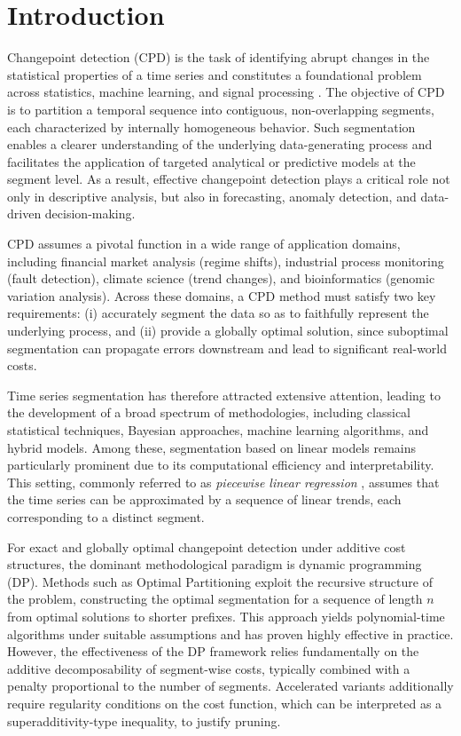 \documentclass[preprints,article,submit,pdftex,moreauthors]{Definitions/mdpi}
\begin{document}
\section{Introduction} 							\label{sec:intro}

Changepoint detection (CPD) is the task of identifying abrupt changes in the statistical properties of a time series and constitutes a foundational problem across statistics, machine learning, and signal processing \cite{LMS14,AC17,TOV20}. The objective of CPD is to partition a temporal sequence into contiguous, non-overlapping segments, each characterized by internally homogeneous behavior. Such segmentation enables a clearer understanding of the underlying data-generating process and facilitates the application of targeted analytical or predictive models at the segment level. As a result, effective changepoint detection plays a critical role not only in descriptive analysis, but also in forecasting, anomaly detection, and data-driven decision-making.

CPD assumes a pivotal function in a wide range of application domains, including financial market analysis (regime shifts), industrial process monitoring (fault detection), climate science (trend changes), and bioinformatics (genomic variation analysis). Across these domains, a CPD method must satisfy two key requirements: (i) accurately segment the data so as to faithfully represent the underlying process, and (ii) provide a globally optimal solution, since suboptimal segmentation can propagate errors downstream and lead to significant real-world costs.

Time series segmentation has therefore attracted extensive attention, leading to the development of a broad spectrum of methodologies, including classical statistical techniques, Bayesian approaches, machine learning algorithms, and hybrid models. Among these, segmentation based on linear models remains particularly prominent due to its computational efficiency and interpretability. This setting, commonly referred to as {\it piecewise linear regression} \cite{KCHP02}, assumes that the time series can be approximated by a sequence of linear trends, each corresponding to a distinct segment. 

For exact and globally optimal changepoint detection under additive cost structures, the dominant methodological paradigm is dynamic programming (DP). Methods such as Optimal Partitioning exploit the recursive structure of the problem, constructing the optimal segmentation for a sequence of length $n$ from optimal solutions to shorter prefixes. This approach yields polynomial-time algorithms under suitable assumptions and has proven highly effective in practice. However, the effectiveness of the DP framework relies fundamentally on the additive decomposability of segment-wise costs, typically combined with a penalty proportional to the number of segments. Accelerated variants additionally require regularity conditions on the cost function, which can be interpreted as a superadditivity-type inequality, to justify pruning.
\end{document}

